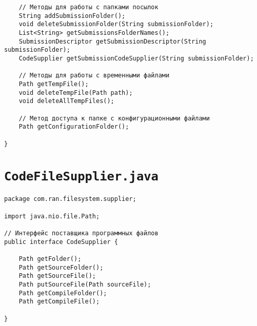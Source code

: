 \begin{verbatim}
    // Методы для работы с папками посылок
    String addSubmissionFolder();
    void deleteSubmissionFolder(String submissionFolder);
    List<String> getSubmissionsFolderNames();
    SubmissionDescriptor getSubmissionDescriptor(String submissionFolder);
    CodeSupplier getSubmissionCodeSupplier(String submissionFolder);

    // Методы для работы с временными файлами
    Path getTempFile();
    void deleteTempFile(Path path);
    void deleteAllTempFiles();

    // Метод доступа к папке с конфигурационными файлами
    Path getConfigurationFolder();
    
}
\end{verbatim}

\section*{\texttt{CodeFileSupplier.java}}
\begin{verbatim}
package com.ran.filesystem.supplier;

import java.nio.file.Path;

// Интерфейс поставщика программных файлов
public interface CodeSupplier {

    Path getFolder();
    Path getSourceFolder();
    Path getSourceFile();
    Path putSourceFile(Path sourceFile);
    Path getCompileFolder();
    Path getCompileFile();

}
\end{verbatim}

